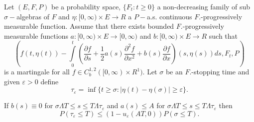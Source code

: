 \setcounter{lemma}{3}
\begin{lemma}\label{chap2:lem3.4} %
Let $(E,F,P)$ be a probability space, $\{F_t: t \ge 0\}$ a
non-decreasing family of sub $\sigma-$algebras of $F$ and $\eta:[0,
  \infty) \times E \to R$ a $P-$a.s. continuous $F$.-progressively
  measurable function. Assume that there exists bounded
  $F.$-progressively measurable functions $a: [0, \infty) \times E\to
    [0,\infty)$ and $b: [0, \infty) \times E \to R$ such that   
$$
(f(t, \eta(t)) - \int\limits_{0}^t (\frac{\partial f}{\partial s}+
        \frac{1}{2} a(s) \frac{\partial^2 f}{\partial x^2}+ b(s)
        \frac{\partial f}{\partial x}) (s, \eta(s)) ds, F_t, P) 
$$
is a martingale for all $f \in C^{1,2}_{b}([0, \infty) \times
  R^1)$. Let $\sigma$ be an $F.$-stopping time and given $\varepsilon >
  0$ define 
$$
\tau_\varepsilon=\inf \{t \ge \sigma :|\eta(t) - \eta(\sigma) |\ge
\varepsilon\}. 
$$

If $b(s) \equiv 0$ for $\sigma \Lambda T \le s \le T \Lambda
\tau_\varepsilon$ and $a(s) \le A$ for $\sigma \Lambda T \le s \le T
\Lambda \tau_\varepsilon$ then  
$$
P(\tau_{\varepsilon} \leq T) \leq (1-u_{\varepsilon}(AT, 0))P(\sigma \leq T).
$$
\end{lemma}

